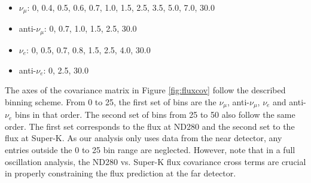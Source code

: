 \begin{itemize}
\item $\nu_\mu$: 0, 0.4, 0.5, 0.6, 0.7, 1.0, 1.5, 2.5, 3.5, 5.0, 7.0, 30.0
\item anti-$\nu_\mu$: 0, 0.7, 1.0, 1.5, 2.5, 30.0
\item $\nu_e$: 0, 0.5, 0.7, 0.8, 1.5, 2.5, 4.0, 30.0
\item anti-$\nu_e$: 0, 2.5, 30.0
\end{itemize}

The axes of the covariance matrix in Figure \ref{fig:fluxcov} follow the described binning scheme. From 0 to 25, the first set of bins are the $\nu_\mu$, anti-$\nu_\mu$, $\nu_e$ and anti-$\nu_e$ bins in that order. The second set of bins from 25 to 50 also follow the same order. The first set corresponds to the flux at ND280 and the second set to the flux at Super-K. As our analysis only uses data from the near detector, any entries outside the 0 to 25 bin range are neglected. However, note that in a full oscillation analysis, the ND280 vs. Super-K flux covariance cross terms are crucial in properly constraining the flux prediction at the far detector.
